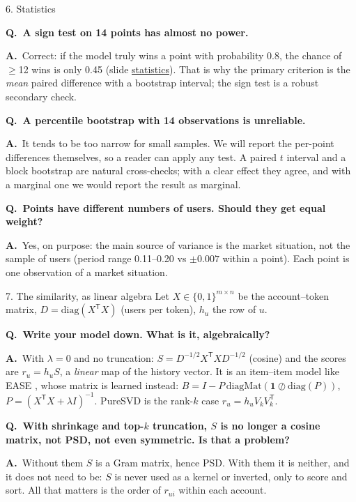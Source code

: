 \documentclass[aspectratio=169,10pt]{beamer}
\newcommand{\Q}[1]{\par{\color{orange}\bfseries Q.\ #1}\par\smallskip}
\newcommand{\A}{{\color{teal}\bfseries A.}\ }
\newcommand{\toindex}{\hfill\hyperlink{index}{\beamerreturnbutton{index}}}
\newcommand{\qsep}{\par\medskip{\color{grey!40}\hrule}\medskip}
\begin{document}
\begin{frame}[label=qstats]{6. Statistics \toindex}
  \footnotesize
  \Q{A sign test on 14 points has almost no power.}
  \A Correct: if the model truly wins a point with probability 0.8, the chance of $\geq$12 wins is only 0.45 (slide \hyperlink{stats}{statistics}). That is why the primary criterion is the \emph{mean} paired difference with a bootstrap interval; the sign test is a robust secondary check.
  \qsep
  \Q{A percentile bootstrap with 14 observations is unreliable.}
  \A It tends to be too narrow for small samples. We will report the per-point differences themselves, so a reader can apply any test. A paired $t$ interval and a block bootstrap \cite{kunsch1989} are natural cross-checks; with a clear effect they agree, and with a marginal one we would report the result as marginal.
  \qsep
  \Q{Points have different numbers of users. Should they get equal weight?}
  \A Yes, on purpose: the main source of variance is the market situation, not the sample of users (period range 0.11--0.20 vs $\pm0.007$ within a point). Each point is one observation of a market situation.
\end{frame}

\begin{frame}[label=qmath]{7. The similarity, as linear algebra \toindex}
  \small
  Let $X\in\{0,1\}^{m\times n}$ be the account--token matrix, $D=\mathrm{diag}(X^{\mathsf{T}} X)$ (users per token), $h_u$ the row of $u$.
  \Q{Write your model down. What is it, algebraically?}
  \A With $\lambda=0$ and no truncation: $S = D^{-1/2}X^{\mathsf{T}} X D^{-1/2}$ (cosine) and the scores are $r_u = h_u S$, a \emph{linear} map of the history vector. It is an item--item model like EASE \cite{steck2019}, whose matrix is learned instead: $B = I - P\,\mathrm{diagMat}(\mathbf{1}\oslash\mathrm{diag}(P))$, $P=(X^{\mathsf{T}} X+\lambda I)^{-1}$. PureSVD \cite{cremonesi2010} is the rank-$k$ case $r_u = h_u V_kV_k^{\mathsf{T}}$.
  \qsep
  \Q{With shrinkage and top-$k$ truncation, $S$ is no longer a cosine matrix, not PSD, not even symmetric. Is that a problem?}
  \A Without them $S$ is a Gram matrix, hence PSD. With them it is neither, and it does not need to be: $S$ is never used as a kernel or inverted, only to score and sort. All that matters is the order of $r_{ui}$ within each account.
\end{frame}
\end{document}
